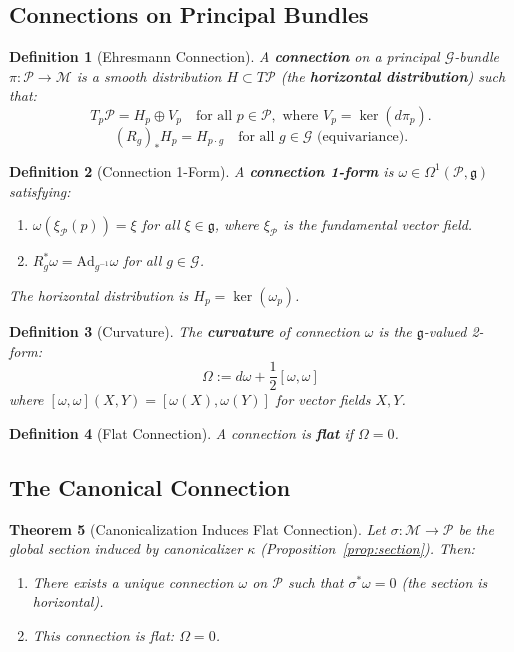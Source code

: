 \documentclass[11pt]{article}
\newtheorem{theorem}{Theorem}[section]
\newtheorem{definition}[theorem]{Definition}
\begin{document}
\subsection{Connections on Principal Bundles}

\begin{definition}[Ehresmann Connection]
A \textbf{connection} on a principal $\mathcal{G}$-bundle $\pi : \mathcal{P} \to \mathcal{M}$
is a smooth distribution $H \subset T\mathcal{P}$ (the \textbf{horizontal distribution}) such that:
\[
T_p \mathcal{P} = H_p \oplus V_p \quad \text{for all } p \in \mathcal{P}, \text{ where } V_p = \ker(d\pi_p).
\]
\[
(R_g)_* H_p = H_{p \cdot g} \quad \text{for all } g \in \mathcal{G} \text{ (equivariance)}.
\]
\end{definition}

\begin{definition}[Connection 1-Form]
A \textbf{connection 1-form} is $\omega \in \Omega^1(\mathcal{P}, \mathfrak{g})$ satisfying:
\begin{enumerate}
    \item[(i)] $\omega(\xi_{\mathcal{P}}(p)) = \xi$ for all $\xi \in \mathfrak{g}$, where $\xi_{\mathcal{P}}$ is the fundamental vector field.
    \item[(ii)] $R_g^* \omega = \mathrm{Ad}_{g^{-1}} \omega$ for all $g \in \mathcal{G}$.
\end{enumerate}
The horizontal distribution is $H_p = \ker(\omega_p)$.
\end{definition}

\begin{definition}[Curvature]
The \textbf{curvature} of connection $\omega$ is the $\mathfrak{g}$-valued 2-form:
\[
\Omega := d\omega + \frac{1}{2}[\omega, \omega]
\]
where $[\omega, \omega](X, Y) = [\omega(X), \omega(Y)]$ for vector fields $X, Y$.
\end{definition}

\begin{definition}[Flat Connection]
A connection is \textbf{flat} if $\Omega = 0$.
\end{definition}

\subsection{The Canonical Connection}

\begin{theorem}[Canonicalization Induces Flat Connection]
\label{thm:flat}
Let $\sigma : \mathcal{M} \to \mathcal{P}$ be the global section
induced by canonicalizer $\kappa$ (Proposition~\ref{prop:section}). Then:
\begin{enumerate}
    \item[(a)] There exists a unique connection $\omega$ on $\mathcal{P}$ such that $\sigma^* \omega = 0$ (the section is horizontal).
    \item[(b)] This connection is flat: $\Omega = 0$.
\end{enumerate}
\end{theorem}
\end{document}
